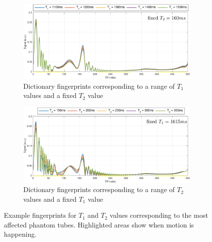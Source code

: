 \begin{figure}[ht]
    \centering
    \begin{subfigure}[b]{.85\textwidth}
        \includegraphics[width=\textwidth]{images/mrf/FixedT2VaryT1TubesMotion}
        \caption{Dictionary fingerprints corresponding to a range of $T_1$ values and a fixed $T_2$ value}
    \end{subfigure}
    
    \begin{subfigure}[b]{.85\textwidth}
        \includegraphics[width=\textwidth]{images/mrf/FixedT1VaryT2TubesMotion}
        \caption{Dictionary fingerprints corresponding to a range of $T_2$ values and a fixed $T_1$ value}
    \end{subfigure}
    
    \caption{Example fingerprints for $T_1$ and $T_2$ values corresponding to the most affected phantom tubes.
    Highlighted areas show when motion is happening.}
    \label{fig:problematicfingerprints}
\end{figure}

